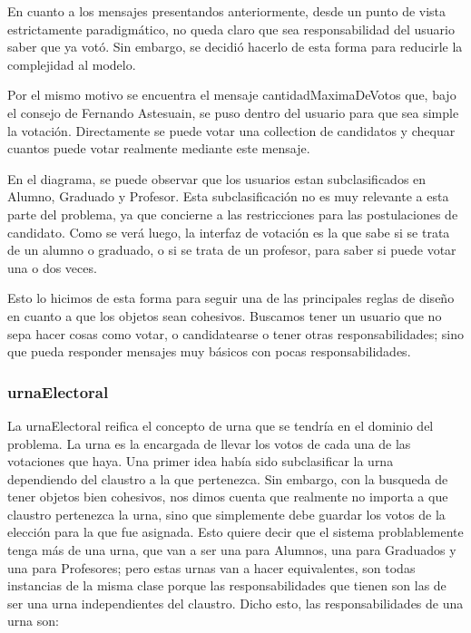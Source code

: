 En cuanto a los mensajes presentandos anteriormente, desde un punto de vista estrictamente paradigm\'atico, no queda claro que sea responsabilidad del usuario saber que ya vot\'o. Sin embargo, se decidi\'o hacerlo de esta forma para reducirle la complejidad al modelo.

Por el mismo motivo se encuentra el mensaje cantidadMaximaDeVotos que, bajo el consejo de Fernando Astesuain, se puso dentro del usuario para que sea simple la votaci\'on. Directamente se puede votar una collection de candidatos y chequar cuantos puede votar realmente mediante este mensaje.

En el diagrama, se puede observar que los usuarios estan subclasificados en Alumno, Graduado y Profesor. Esta subclasificaci\'on no es muy relevante a esta parte del problema, ya que concierne a las restricciones para las postulaciones de candidato. Como se ver\'a luego, la interfaz de votaci\'on es la que sabe si se trata de un alumno o graduado, o si se trata de un profesor, para saber si puede votar una o dos veces.

Esto lo hicimos de esta forma para seguir una de las principales reglas de diseño en cuanto a que los objetos sean cohesivos. Buscamos tener un usuario que no sepa hacer cosas como votar, o candidatearse o tener otras responsabilidades; sino que pueda responder mensajes muy b\'asicos con pocas responsabilidades.

\subsubsection{urnaElectoral}

La urnaElectoral reifica el concepto de urna que se tendr\'ia en el dominio del problema. La urna es la encargada de llevar los votos de cada una de las votaciones que haya. Una primer idea hab\'ia sido subclasificar la urna dependiendo del claustro a la que pertenezca. Sin embargo, con la busqueda de tener objetos bien cohesivos, nos dimos cuenta que realmente no importa a que claustro pertenezca la urna, sino que simplemente debe guardar los votos de la elecci\'on para la que fue asignada. Esto quiere decir que el sistema problablemente tenga m\'as de una urna, que van a ser una para Alumnos, una para Graduados y una para Profesores; pero estas urnas van a hacer equivalentes, son todas instancias de la misma clase porque las responsabilidades que tienen son las de ser una urna independientes del claustro. Dicho esto, las responsabilidades de una urna son:

